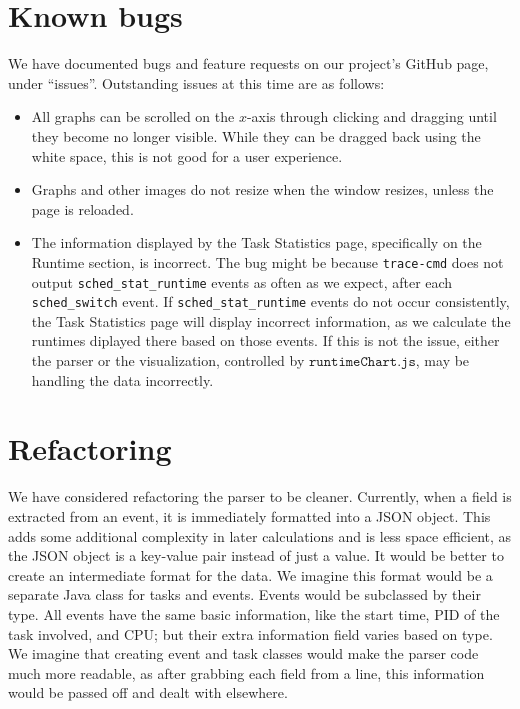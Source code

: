 \documentclass{hmcclinic}
\begin{document}
\section{Known bugs}

  We have documented bugs and feature requests on our project's GitHub page, under ``issues''. Outstanding issues at this time are as
  follows:

  \begin{itemize}
  
  \item All graphs can be scrolled on the $x$-axis through clicking and dragging until they become no longer visible. While
    they can be dragged back using the white space, this is not good for a user
    experience.

  \item Graphs and other images do not resize when the window resizes, unless the
    page is reloaded.

  \item The information displayed by the Task Statistics page, specifically on
    the Runtime section, is incorrect. The bug might be because
    \texttt{trace-cmd} does not output \texttt{sched\_stat\_runtime} events as
    often as we expect,  after each \texttt{sched\_switch} event. If
    \texttt{sched\_stat\_runtime} events do not occur consistently, the Task
    Statistics page will display incorrect information, as we calculate the runtimes diplayed there based on those events. If this is not the
    issue, either the parser or the visualization, controlled by
    $\texttt{runtimeChart.js}$,  may be handling the data
    incorrectly.

\end{itemize}


  \section{Refactoring}

  We have considered refactoring the parser to be cleaner. Currently, when a
  field is extracted from an event, it is immediately formatted into a JSON
  object.  This adds some additional complexity in later calculations and is
  less space efficient, as the JSON object is a key-value pair instead of just a value.
It would be better to create an intermediate format for the
  data. We imagine this format would be a separate Java class for tasks and
  events. Events would be subclassed by their type. All events have the same
  basic information, like the start time, PID of the task involved, and CPU; but
  their extra information field varies based on type. We imagine that creating
  event and task classes would make the parser code much more readable, as after
  grabbing each field from a line, this information would be passed off and
  dealt with elsewhere. 
\end{document}
